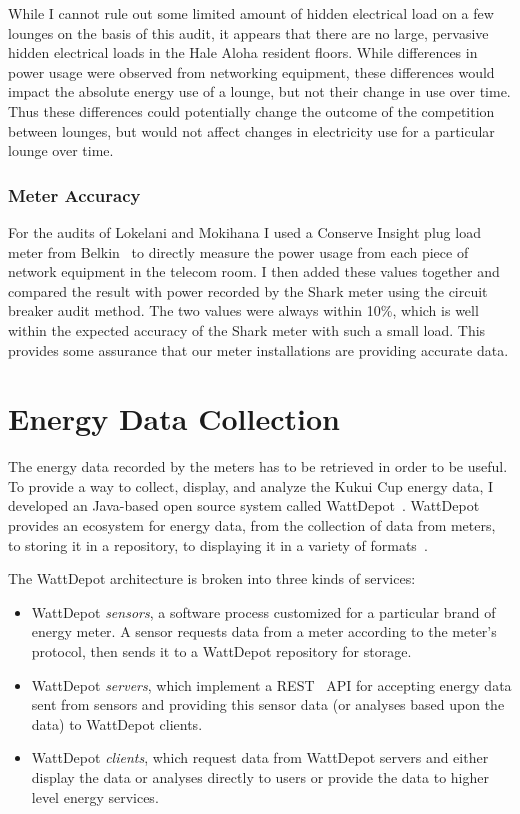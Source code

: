 While I cannot rule out some limited amount of hidden electrical load on a few lounges on the basis of this audit, it appears that there are no large, pervasive hidden electrical loads in the Hale Aloha resident floors. While differences in power usage were observed from networking equipment, these differences would impact the absolute energy use of a lounge, but not their change in use over time. Thus these differences could potentially change the outcome of the competition between lounges, but would not affect changes in electricity use for a particular lounge over time.


\subsubsection{Meter Accuracy}

For the audits of Lokelani and Mokihana I used a Conserve Insight plug load meter from Belkin~\cite{belkin-insight} to directly measure the power usage from each piece of network equipment in the telecom room. I then added these values together and compared the result with power recorded by the Shark meter using the circuit breaker audit method. The two values were always within 10\%, which is well within the expected accuracy of the Shark meter with such a small load. This provides some assurance that our meter installations are providing accurate data.


\section{Energy Data Collection}

The energy data recorded by the meters has to be retrieved in order to be useful. To provide a way to collect, display, and analyze the Kukui Cup energy data, I developed an Java-based open source system called WattDepot~\cite{csdl2-10-05}. WattDepot provides an ecosystem for energy data, from the collection of data from meters, to storing it in a repository, to displaying it in a variety of formats~\cite{WattDepot}.

The WattDepot architecture is broken into three kinds of services:

\begin{itemize}
\item WattDepot \emph{sensors}, a software process customized for a particular brand of energy meter. A sensor requests data from a meter according to the meter's protocol, then sends it to a WattDepot repository for storage.

\item WattDepot \emph{servers}, which implement a REST~\cite{REST} API for accepting energy data sent from sensors and providing this sensor data (or analyses based upon the data) to WattDepot clients.

\item WattDepot \emph{clients}, which request data from WattDepot servers and either display the data or analyses directly to users or provide the data to higher level energy services.
\end{itemize}

